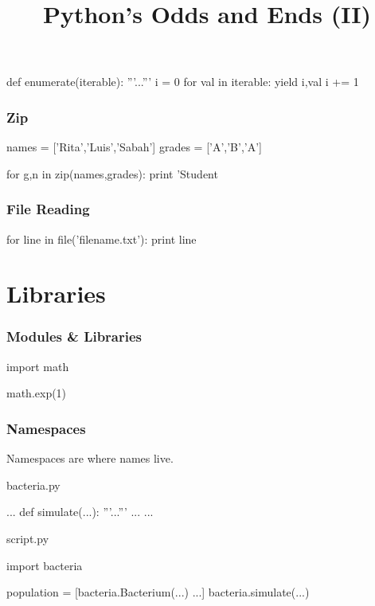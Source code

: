 
\title{Python's Odds and Ends (II)}

\frame{\maketitle}

\begin{frame}[fragile]
\begin{python}
def enumerate(iterable):
    '''...'''
    i = 0
    for val in iterable:
        yield i,val
        i += 1
\end{python}
\end{frame}

\begin{frame}[fragile]
\frametitle{Zip}

\begin{python}
names = ['Rita','Luis','Sabah']
grades = ['A','B','A']

for g,n in zip(names,grades):
    print 'Student %
\end{python}

\end{frame}

\begin{frame}[fragile]
\frametitle{File Reading}

\begin{python}
for line in file('filename.txt'):
    print line
\end{python}

\end{frame}

\section{Libraries}

\begin{frame}[fragile]
\frametitle{Modules \& Libraries}
\begin{python}
import math

math.exp(1)
\end{python}
\end{frame}

\begin{frame}[fragile]
\frametitle{Namespaces}
Namespaces are where names live.
\end{frame}

\begin{frame}[fragile]

\begin{block}{bacteria.py}
\begin{python}
...
def simulate(...):
    '''...'''
    ...
...
\end{python}
\end{block}

\begin{block}{script.py}
\begin{python}
import bacteria

population = [bacteria.Bacterium(...) ...]
bacteria.simulate(...)
\end{python}
\end{block}

\end{frame}

